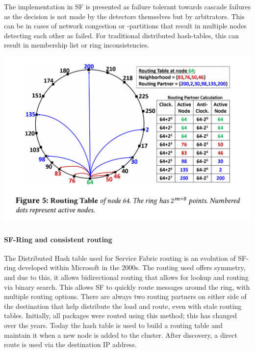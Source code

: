 \documentclass[a4paper,10pt,titlepage]{report}
\begin{document}
    The implementation in SF is presented as failure tolerant towards cascade failures as the decision is not made by the detectors themselves but by arbitrators.
    This can be in cases of network congestion or -partitions that result in multiple nodes detecting each other as failed. For traditional distributed hash-tables, this can result in membership list or ring inconsistencies.\\ 
    \vspace{5mm}

    \includegraphics[scale=0.3]{images/servicefabric-fig-ring-topology.jpeg}

    \paragraph{SF-Ring and consistent routing}

    The Distributed Hash table used for Service Fabric routing is an evolution of SF-ring developed within Microsoft in the 2000s. The routing used offers symmetry, and due to this, it allows bidirectional routing that allows for lookup and routing via binary search. This allows SF to quickly route messages around the ring, with multiple routing options. There are always two routing partners on either side of the destination that help distribute the load and route, even with stale routing tables. Initially, all packages were routed using this method; this has changed over the years. Today the hash table is used to build a routing table and maintain it when a new node is added to the cluster. After discovery, a direct route is used via the destination IP address. \\
    \vspace{5mm}
\end{document}
